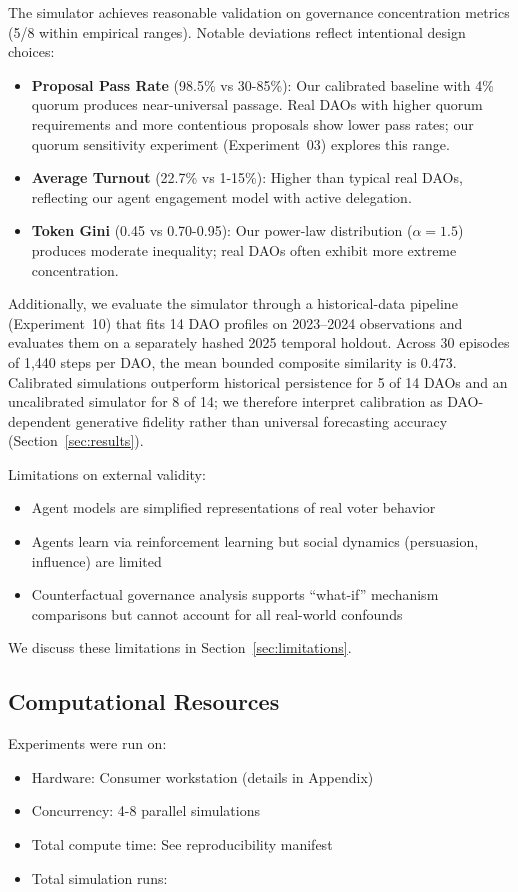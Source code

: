 The simulator achieves reasonable validation on governance concentration metrics (5/8 within empirical ranges). Notable deviations reflect intentional design choices:
\begin{itemize}
    \item \textbf{Proposal Pass Rate} (98.5\% vs 30-85\%): Our calibrated baseline with 4\% quorum produces near-universal passage. Real DAOs with higher quorum requirements and more contentious proposals show lower pass rates; our quorum sensitivity experiment (Experiment~03) explores this range.
    \item \textbf{Average Turnout} (22.7\% vs 1-15\%): Higher than typical real DAOs, reflecting our agent engagement model with active delegation.
    \item \textbf{Token Gini} (0.45 vs 0.70-0.95): Our power-law distribution ($\alpha=1.5$) produces moderate inequality; real DAOs often exhibit more extreme concentration.
\end{itemize}

Additionally, we evaluate the simulator through a historical-data pipeline (Experiment~10) that fits 14 DAO profiles on 2023--2024 observations and evaluates them on a separately hashed 2025 temporal holdout. Across 30 episodes of 1,440 steps per DAO, the mean bounded composite similarity is 0.473. Calibrated simulations outperform historical persistence for 5 of 14 DAOs and an uncalibrated simulator for 8 of 14; we therefore interpret calibration as DAO-dependent generative fidelity rather than universal forecasting accuracy (Section~\ref{sec:results}).

Limitations on external validity:
\begin{itemize}
    \item Agent models are simplified representations of real voter behavior
    \item Agents learn via reinforcement learning but social dynamics (persuasion, influence) are limited
    \item Counterfactual governance analysis supports ``what-if'' mechanism comparisons but cannot account for all real-world confounds
\end{itemize}

We discuss these limitations in Section~\ref{sec:limitations}.

\subsection{Computational Resources}

Experiments were run on:
\begin{itemize}
    \item Hardware: Consumer workstation (details in Appendix)
    \item Concurrency: 4-8 parallel simulations
    \item Total compute time: See reproducibility manifest
    \item Total simulation runs: \totalruns{}
\end{itemize}
